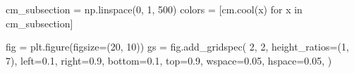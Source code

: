\documentclass[
  letterpaper,
  DIV=11,
  numbers=noendperiod]{scrartcl}
\newenvironment{Shaded}{\begin{snugshade}}{\end{snugshade}}
\newcommand{\ControlFlowTok}[1]{\textcolor[rgb]{0.00,0.23,0.31}{#1}}
\newcommand{\DecValTok}[1]{\textcolor[rgb]{0.68,0.00,0.00}{#1}}
\newcommand{\FloatTok}[1]{\textcolor[rgb]{0.68,0.00,0.00}{#1}}
\newcommand{\KeywordTok}[1]{\textcolor[rgb]{0.00,0.23,0.31}{#1}}
\newcommand{\NormalTok}[1]{\textcolor[rgb]{0.00,0.23,0.31}{#1}}
\newcommand{\OperatorTok}[1]{\textcolor[rgb]{0.37,0.37,0.37}{#1}}
\begin{document}
\begin{Shaded}
\begin{Highlighting}[]
\NormalTok{cm\_subsection }\OperatorTok{=}\NormalTok{ np.linspace(}\DecValTok{0}\NormalTok{, }\DecValTok{1}\NormalTok{, }\DecValTok{500}\NormalTok{)}
\NormalTok{colors }\OperatorTok{=}\NormalTok{ [cm.cool(x) }\ControlFlowTok{for}\NormalTok{ x }\KeywordTok{in}\NormalTok{ cm\_subsection]}

\NormalTok{fig }\OperatorTok{=}\NormalTok{ plt.figure(figsize}\OperatorTok{=}\NormalTok{(}\DecValTok{20}\NormalTok{, }\DecValTok{10}\NormalTok{))}
\NormalTok{gs }\OperatorTok{=}\NormalTok{ fig.add\_gridspec(}
    \DecValTok{2}\NormalTok{,}
    \DecValTok{2}\NormalTok{,}
\NormalTok{    height\_ratios}\OperatorTok{=}\NormalTok{(}\DecValTok{1}\NormalTok{, }\DecValTok{7}\NormalTok{),}
\NormalTok{    left}\OperatorTok{=}\FloatTok{0.1}\NormalTok{,}
\NormalTok{    right}\OperatorTok{=}\FloatTok{0.9}\NormalTok{,}
\NormalTok{    bottom}\OperatorTok{=}\FloatTok{0.1}\NormalTok{,}
\NormalTok{    top}\OperatorTok{=}\FloatTok{0.9}\NormalTok{,}
\NormalTok{    wspace}\OperatorTok{=}\FloatTok{0.05}\NormalTok{,}
\NormalTok{    hspace}\OperatorTok{=}\FloatTok{0.05}\NormalTok{,}
\NormalTok{)}


\end{Highlighting}
\end{Shaded}
\end{document}
